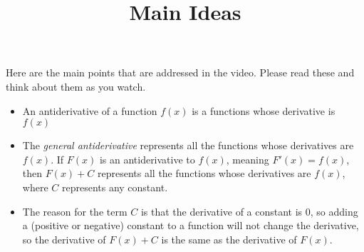 \documentclass[handout]{ximera}
\title{Main Ideas}
\begin{document}
\begin{abstract}
\end{abstract}

\maketitle

Here are the main points that are addressed in the video. Please read these and think about them as you watch.

\begin{itemize}
\item An antiderivative of a function $f(x)$ is a functions whose derivative is $f(x)$
\item The \textit{general antiderivative} represents all the functions whose derivatives are $f(x)$. If $F(x)$ is an antiderivative to $f(x)$, meaning $F'(x)=f(x)$, then $F(x)+C$ represents all the functions whose derivatives are $f(x)$, where $C$ represents any constant.
\item The reason for the term $C$ is that the derivative of a constant is 0, so adding a (positive or negative) constant to a function will not change the derivative, so the derivative of $F(x)+C$ is the same as the derivative of $F(x)$.
\end{itemize}
\end{document}
